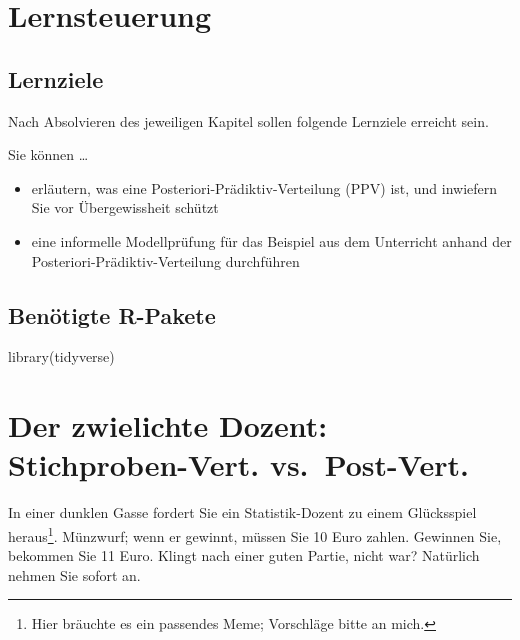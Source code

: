 \documentclass[
  a4paper,
  DIV=11]{scrreprt}
\newenvironment{Shaded}{\begin{snugshade}}{\end{snugshade}}
\newcommand{\FunctionTok}[1]{\textcolor[rgb]{0.28,0.35,0.67}{#1}}
\newcommand{\NormalTok}[1]{\textcolor[rgb]{0.00,0.23,0.31}{#1}}
\providecommand{\tightlist}{%
  \setlength{\itemsep}{0pt}\setlength{\parskip}{0pt}}\usepackage{longtable,booktabs,array}
\theoremstyle{definition}
\theoremstyle{remark}
\begin{document}
\hypertarget{lernsteuerung-5}{%
\section{Lernsteuerung}\label{lernsteuerung-5}}

\hypertarget{lernziele-6}{%
\subsection{Lernziele}\label{lernziele-6}}

Nach Absolvieren des jeweiligen Kapitel sollen folgende Lernziele
erreicht sein.

Sie können \ldots{}

\begin{itemize}
\tightlist
\item
  erläutern, was eine Posteriori-Prädiktiv-Verteilung (PPV) ist, und
  inwiefern Sie vor Übergewissheit schützt
\item
  eine informelle Modellprüfung für das Beispiel aus dem Unterricht
  anhand der Posteriori-Prädiktiv-Verteilung durchführen
\end{itemize}

\hypertarget{benuxf6tigte-r-pakete-3}{%
\subsection{Benötigte R-Pakete}\label{benuxf6tigte-r-pakete-3}}

\begin{Shaded}
\begin{Highlighting}[]
\FunctionTok{library}\NormalTok{(tidyverse)}
\end{Highlighting}
\end{Shaded}

\hypertarget{der-zwielichte-dozent-stichproben-vert.-vs.-post-vert.}{%
\section{Der zwielichte Dozent: Stichproben-Vert.
vs.~Post-Vert.}\label{der-zwielichte-dozent-stichproben-vert.-vs.-post-vert.}}

In einer dunklen Gasse fordert Sie ein Statistik-Dozent zu einem
Glücksspiel heraus\footnote{Hier bräuchte es ein passendes Meme;
  Vorschläge bitte an mich.}. Münzwurf; wenn er gewinnt, müssen Sie 10
Euro zahlen. Gewinnen Sie, bekommen Sie 11 Euro. Klingt nach einer guten
Partie, nicht war? Natürlich nehmen Sie sofort an.
\end{document}
